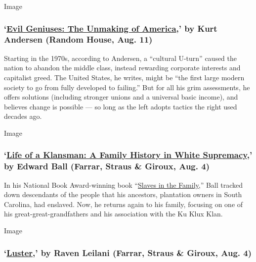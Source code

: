 Image

\hypertarget{evil-geniuses-the-unmaking-of-america-by-kurt-andersen-random-house-aug-11}{%
\subsubsection{\texorpdfstring{`\href{https://www.penguinrandomhouse.com/books/594493/evil-geniuses-by-kurt-andersen/}{Evil
Geniuses: The Unmaking of America},' by Kurt Andersen (Random House,
Aug.
11)}{`Evil Geniuses: The Unmaking of America,' by Kurt Andersen (Random House, Aug. 11)}}\label{evil-geniuses-the-unmaking-of-america-by-kurt-andersen-random-house-aug-11}}

Starting in the 1970s, according to Andersen, a ``cultural U-turn''
caused the nation to abandon the middle class, instead rewarding
corporate interests and capitalist greed. The United States, he writes,
might be ``the first large modern society to go from fully developed to
failing.'' But for all his grim assessments, he offers solutions
(including stronger unions and a universal basic income), and believes
change is possible --- so long as the left adopts tactics the right used
decades ago.

Image

\hypertarget{life-of-a-klansman-a-family-history-in-white-supremacy-by-edward-ball-farrar-straus--giroux-aug-4}{%
\subsubsection{\texorpdfstring{`\href{https://us.macmillan.com/books/9780374186326}{Life
of a Klansman: A Family History in White Supremacy},' by Edward Ball
(Farrar, Straus \& Giroux, Aug.
4)}{`Life of a Klansman: A Family History in White Supremacy,' by Edward Ball (Farrar, Straus \& Giroux, Aug. 4)}}\label{life-of-a-klansman-a-family-history-in-white-supremacy-by-edward-ball-farrar-straus--giroux-aug-4}}

In his National Book Award-winning book
``\href{https://archive.nytimes3xbfgragh.onion/www.nytimes3xbfgragh.onion/books/98/03/01/reviews/980301.01faustt.html}{Slaves
in the Family},'' Ball tracked down descendants of the people that his
ancestors, plantation owners in South Carolina, had enslaved. Now, he
returns again to his family, focusing on one of his
great-great-grandfathers and his association with the Ku Klux Klan.

Image

\hypertarget{luster-by-raven-leilani-farrar-straus--giroux-aug-4}{%
\subsubsection{\texorpdfstring{`\href{https://us.macmillan.com/books/9780374910334}{Luster},'
by Raven Leilani (Farrar, Straus \& Giroux, Aug.
4)}{`Luster,' by Raven Leilani (Farrar, Straus \& Giroux, Aug. 4)}}\label{luster-by-raven-leilani-farrar-straus--giroux-aug-4}}

